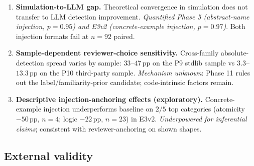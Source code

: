 \begin{enumerate}[leftmargin=2em]
\item \textbf{Simulation-to-LLM gap.} Theoretical convergence in simulation does not transfer to LLM detection improvement. \emph{Quantified Phase 5 (abstract-name injection, $p = 0.95$) and E3v2 (concrete-example injection, $p = 0.97$)}. Both injection formats fail at $n = 92$ paired.

\item \textbf{Sample-dependent reviewer-choice sensitivity.} Cross-family absolute-detection spread varies by sample: $33$--$47\,\mathrm{pp}$ on the P9 stdlib sample vs $3.3$--$13.3\,\mathrm{pp}$ on the P10 third-party sample. \emph{Mechanism unknown}: Phase 11 rules out the label/familiarity-prior candidate; code-intrinsic factors remain.

\item \textbf{Descriptive injection-anchoring effects (exploratory).} Concrete-example injection underperforms baseline on $2/5$ top categories (atomicity $-50\,\mathrm{pp}$, $n=4$; logic $-22\,\mathrm{pp}$, $n=23$) in E3v2. \emph{Underpowered for inferential claims}; consistent with reviewer-anchoring on shown shapes.
\end{enumerate}

\subsection{External validity}
\label{sec:external-validity}

